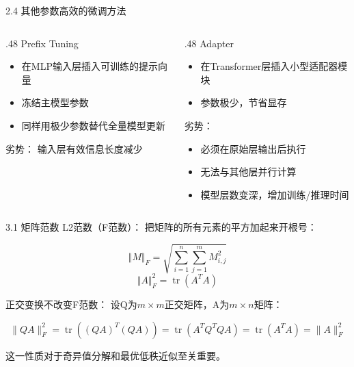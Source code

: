 \documentclass[aspectratio=169,10pt]{beamer}
\begin{document}
\begin{frame}[fragile,shrink=12]{2.4 其他参数高效的微调方法}
\footnotesize
\begin{columns}[T,onlytextwidth]
  \begin{column}{.48\textwidth}
    \alert{Prefix Tuning}
    
    \begin{itemize}
    \item
      在MLP输入层插入可训练的提示向量
    \item
      冻结主模型参数
    \item
      同样用极少参数替代全量模型更新
    \end{itemize}
    
    \alert{劣势：} 输入层有效信息长度减少
  \end{column}
  \begin{column}{.48\textwidth}
    \alert{Adapter}
    
    \begin{itemize}
    \item
      在Transformer层插入小型适配器模块
    \item
      参数极少，节省显存
    \end{itemize}
    
    \alert{劣势：}
\begin{itemize}
\item 必须在原始层输出后执行
\item 无法与其他层并行计算
\item 模型层数变深，增加训练/推理时间
\end{itemize}
  \end{column}
\end{columns}
\end{frame}

\begin{frame}[fragile,shrink=12]{3.1 矩阵范数}
\footnotesize
\alert{L2范数（F范数）：} 把矩阵的所有元素的平方加起来开根号：

\[\Vert M \Vert_F = \sqrt{\sum_{i=1}^n \sum_{j=1}^m M_{i,j}^2}\] \[\Vert A \Vert_F^2 = \operatorname{tr}(A^T A)\]

正交变换不改变F范数： 设Q为\(m \times m\)正交矩阵，A为\(m \times n\)矩阵：

\[\|QA\|_F^2 = \operatorname{tr}((QA)^T (QA)) = \operatorname{tr}(A^T Q^T Q A) = \operatorname{tr}(A^T A) = \|A\|_F^2\]

这一性质对于奇异值分解和最优低秩近似至关重要。
\end{frame}
\end{document}

